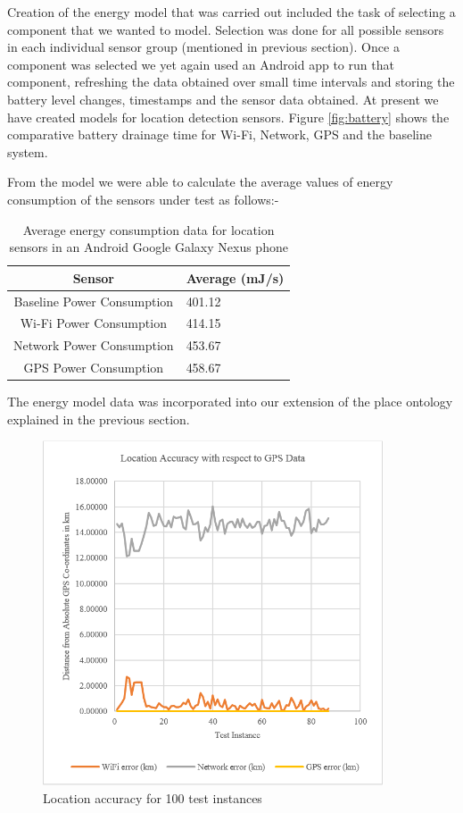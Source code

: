 \documentclass{ubicomp2013}
\begin{document}
Creation of the energy model that was carried out included the task of selecting a component that we wanted to model. Selection was done for all possible sensors in each individual sensor group (mentioned in previous section). Once a component was selected we yet again used an Android app to run that component, refreshing the data obtained over small time intervals and storing the battery level changes, timestamps and the sensor data obtained. At present we have created models for location detection sensors. Figure \ref{fig:battery} shows the comparative battery drainage time for Wi-Fi, Network, GPS and the baseline system.
  
From the model we were able to calculate the average values of energy consumption of the sensors under test as follows:-
\begin{table}
\centering
\caption{Average energy consumption data for location sensors in an Android Google Galaxy Nexus phone}
\begin{tabular}{|c|l|} \hline
Sensor&Average (mJ/s)\\ \hline
Baseline Power Consumption&401.12\\ \hline
Wi-Fi Power Consumption&414.15\\ \hline
Network Power Consumption&453.67\\ \hline
GPS Power Consumption&458.67\\ \hline
\hline\end{tabular}
\end{table}

The energy model data was incorporated into our extension of the place ontology explained in the previous section.

\begin{figure}[tbh]
\centering
\includegraphics[width=0.9\textwidth]{Accuracy.png}
\caption{Location accuracy for 100 test instances}
\label{fig:accuracy}
\end{figure}
\end{document}
